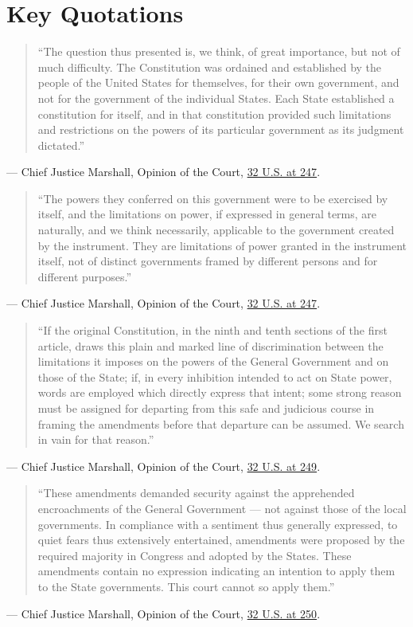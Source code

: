 \documentclass[12pt]{article}
\begin{document}
\section{Key Quotations}

\begin{quote}
``The question thus presented is, we think, of great importance, but not of much difficulty. The Constitution was ordained and established by the people of the United States for themselves, for their own government, and not for the government of the individual States. Each State established a constitution for itself, and in that constitution provided such limitations and restrictions on the powers of its particular government as its judgment dictated.''
\end{quote}
\noindent --- Chief Justice Marshall, Opinion of the Court, \href{https://supreme.justia.com/cases/federal/us/32/243/}{32 U.S. at 247}.

\begin{quote}
``The powers they conferred on this government were to be exercised by itself, and the limitations on power, if expressed in general terms, are naturally, and we think necessarily, applicable to the government created by the instrument. They are limitations of power granted in the instrument itself, not of distinct governments framed by different persons and for different purposes.''
\end{quote}
\noindent --- Chief Justice Marshall, Opinion of the Court, \href{https://supreme.justia.com/cases/federal/us/32/243/}{32 U.S. at 247}.

\begin{quote}
``If the original Constitution, in the ninth and tenth sections of the first article, draws this plain and marked line of discrimination between the limitations it imposes on the powers of the General Government and on those of the State; if, in every inhibition intended to act on State power, words are employed which directly express that intent; some strong reason must be assigned for departing from this safe and judicious course in framing the amendments before that departure can be assumed. We search in vain for that reason.''
\end{quote}
\noindent --- Chief Justice Marshall, Opinion of the Court, \href{https://supreme.justia.com/cases/federal/us/32/243/}{32 U.S. at 249}.

\begin{quote}
``These amendments demanded security against the apprehended encroachments of the General Government --- not against those of the local governments. In compliance with a sentiment thus generally expressed, to quiet fears thus extensively entertained, amendments were proposed by the required majority in Congress and adopted by the States. These amendments contain no expression indicating an intention to apply them to the State governments. This court cannot so apply them.''
\end{quote}
\noindent --- Chief Justice Marshall, Opinion of the Court, \href{https://supreme.justia.com/cases/federal/us/32/243/}{32 U.S. at 250}.
\end{document}
